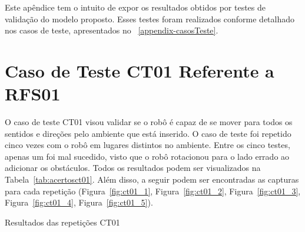 Este apêndice tem o intuito de expor os resultados obtidos por testes de validação do modelo proposto. Esses testes foram realizados conforme detalhado nos casos de teste, apresentados no \appendixautorefname~\ref{appendix-casosTeste}.

\section{Caso de Teste CT01 Referente a RFS01}
O caso de teste CT01 visou validar se o robô é capaz de se mover para todos os sentidos e direções pelo ambiente que está inserido. O caso de teste foi repetido cinco vezes com o robô em lugares distintos no ambiente. Entre os cinco testes, apenas um foi mal sucedido, visto que o robô rotacionou para o lado errado ao adicionar os obstáculos. Todos os resultados podem ser visualizados na Tabela~\ref{tab:acertosct01}. Além disso, a seguir podem ser encontradas as capturas para cada repetição (Figura~\ref{fig:ct01_1}, Figura~\ref{fig:ct01_2}, Figura~\ref{fig:ct01_3}, Figura~\ref{fig:ct01_4}, Figura~\ref{fig:ct01_5}).

\begin{table}[H]
\centering
\caption{Resultados das repetições CT01}
\label{tab:acertosct01}
\caption*{Fonte: Autora (2023).}
\end{table}


